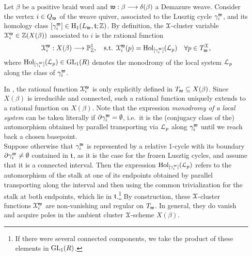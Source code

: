 \begin{fdef}\label{def:Xvariables_via_fillings}
Let $\beta$ be a positive braid word and $\wb$ a Demazure weave. Consider the vertex $i\in Q_\w$ of the weave quiver, associated to the Lusztig cycle $\g_i^\w$, and its homology class $[\g_i^\w]\in \hH_1(L_\w,\tt;\Z)$. By definition, the $\SX$-cluster variable $\SX_i^\w\in \Z(X(\beta))$ associated to $i$ is the rational function
\begin{equation}\label{eq:Xvariable_via_fillings}
\SX_i^\w:X(\beta)\lr\PP^1_\Z,\quad\mbox{s.t. } \SX_i^\w(p)=\hol_{[\g_i^\w]}(\LL_p)\quad\forall p\in T^\SX_\w,
\end{equation}
where $\hol_{[\g_i^\w]}(\LL_p)\in\GL_1(R)$ denotes the monodromy of the local system $\LL_p$ along the class of $\g_i^\w$.\sbs
\end{fdef}
\noindent In , the rational function $\SX_i^\w$ is only explicitly defined in $T_\w\sse X(\beta)$. Since $X(\beta)$ is irreducible and connected, such a rational function uniquely extends to a rational function on $X(\beta)$. Note that the expression {\it monodromy of a local system} can be taken literally if $\dd\g_i^\w=\emptyset$, i.e.~it is the (conjugacy class of the) automorphism obtained by parallel transporting via $\LL_p$ along $\g_i^\w$ until we reach back a chosen basepoint.\\

Suppose otherwise that $\g_i^\w$ is represented by a relative 1-cycle with its boundary $\dd\g_i^\w\neq\emptyset$ contained in $\tt$, as it is the case for the frozen Lusztig cycles, and assume that it is a connected interval. Then the expression $\hol_{[\g_i^\w]}(\LL_p)$ refers to the automorphism of the stalk at one of its endpoints obtained by parallel transporting along the interval and then using the common trivialization for the stalk at both endpoints, which lie in $\tt$.\footnote{If there were several connected components, we take the product of these elements in $\GL_1(R)$.} By construction, these $\SX$-cluster functions $\SX_i^\w$ are non-vanishing and regular on $T_\w$. In general, they do vanish and acquire poles in the ambient cluster $\SX$-scheme $X(\beta)$.\\

